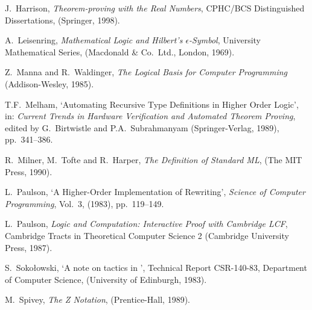 \begin{thebibliography}{99}
J.\ Harrison,
{\it Theorem-proving with the Real Numbers},
{\rm CPHC/BCS Distinguished Dissertations},
(Springer, 1998).

A.\ Leisenring,
{\it Mathematical Logic and Hilbert's $\epsilon$-Symbol\/},
{\rm University Mathematical Series},
(Macdonald \& Co.\ Ltd., London, 1969).

Z.\ Manna and R.\ Waldinger,
{\it The Logical Basis for Computer Programming\/}
(Addison-Wesley, 1985).

T.F.\ Melham, `Automating Recursive Type Definitions
in Higher Order Logic',
in: {\it Current Trends in Hardware Verification and
Automated Theorem Proving\/}, edited by G.\ Birtwistle
and P.A.\ Subrahmanyam
(Springer-Verlag, 1989), pp.\ 341--386.

R.\ Milner, M.\ Tofte and R.\ Harper,
{\it The Definition of Standard ML\/},
(The MIT Press, 1990).

L.\ Paulson,
`A Higher-Order Implementation of Rewriting',
{\it Science of Computer Programming}, Vol.\ 3, (1983), pp.\ 119--149.

 L.\ Paulson,
{\it Logic and Computation: Interactive Proof with Cambridge LCF},
Cambridge Tracts in Theoretical Computer Science 2
(Cambridge University Press, 1987).

%
S.\ Soko\l owski, `A note on tactics in \LCF',
Technical Report CSR-140-83, Department of Computer Science,
(University of Edinburgh, 1983).


M.\ Spivey,
{\it The Z Notation}, (Prentice-Hall, 1989).

\end{thebibliography}



